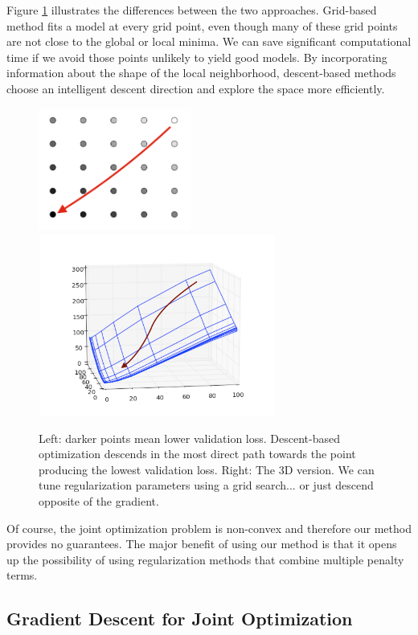 \documentclass[10pt,letterpaper]{article}
\begin{document}
Figure \ref{fig:compare} illustrates the differences between the two approaches. Grid-based method fits a model at every grid point, even though many of these grid points are not close to the global or local minima. We can save significant computational time if we avoid those points unlikely to yield good models. By incorporating information about the shape of the local neighborhood, descent-based methods choose an intelligent descent direction and explore the space more efficiently. 

\begin{figure}
\begin{center}
\includegraphics[height=40mm]{grid_search_vs_descent.png}
\includegraphics[height=60mm]{surface_in_regularization_parameters.png}
\end{center}
\caption{Left: darker points mean lower validation loss. Descent-based optimization descends in the most direct path towards the point producing the lowest validation loss. Right: The 3D version. We can tune regularization parameters using a grid search... or just descend opposite of the gradient.}
\label{fig:compare}
\end{figure}

Of course, the joint optimization problem is non-convex and therefore our method provides no guarantees. The major benefit of using our method is that it opens up the possibility of using regularization methods that combine multiple penalty terms.

\subsection{Gradient Descent for Joint Optimization}
\end{document}
